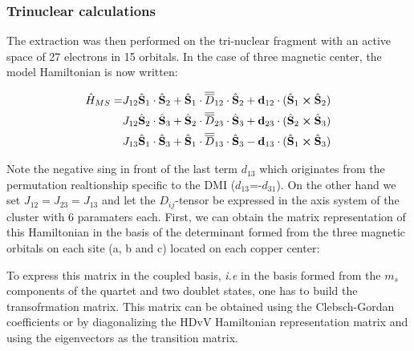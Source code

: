 \documentclass[10pt]{report}
\numberwithin{equation}{section}
\begin{document}
\subsubsection*{Trinuclear calculations}

The extraction was then performed on the tri-nuclear fragment with an active space of 27 electrons in 15 orbitals.
In the case of three magnetic center, the model Hamiltonian is now written:


\begin{equation}
    \begin{split}
    \hat{H}_{MS}=&J_{12} \hat{\vb S}_1 \cdot \hat{\vb S}_2 + \hat{\vb S}_1 \cdot\overline{\overline{D}}_{12} \cdot \hat{\vb S}_2 + \vb{d}_{12} \cdot (\hat{\vb S}_1 \cross \hat{\vb S}_2)\\
    &J_{12} \hat{\vb S}_2 \cdot \hat{\vb S}_3 + \hat{\vb S}_2 \cdot\overline{\overline{D}}_{23} \cdot \hat{\vb S}_3 + \vb{d}_{23} \cdot (\hat{\vb S}_2 \cross \hat{\vb S}_3)\\
    &J_{13} \hat{\vb S}_1 \cdot \hat{\vb S}_3 + \hat{\vb S}_1 \cdot\overline{\overline{D}}_{13} \cdot \hat{\vb S}_3 - \vb{d}_{13} \cdot (\hat{\vb S}_1 \cross \hat{\vb S}_3)
    \end{split}
\end{equation}

Note the negative sing in front of the last term $d_{13}$ which originates from the permutation realtionship specific to the DMI ($d_{13}$=-$d_{31}$). On the other hand we set $J_{12}=J_{23}=J_{13}$ and let the $D_{ij}$-tensor be expressed in the axis system of the cluster with 6 paramaters each.
First, we can obtain the matrix representation of this Hamiltonian in the basis of the determinant formed from the three magnetic orbitals on each site (a, b and c) located on each copper center:


To express this matrix in the coupled basis, \textit{i.e} in the basis formed from the $m_s$ components of the quartet and two doublet states, one has to build the transofrmation matrix.
This matrix can be obtained using the Clebsch-Gordan coefficients or by diagonalizing the HDvV Hamiltonian representation matrix and using the eigenvectors as the transition matrix.
\end{document}
